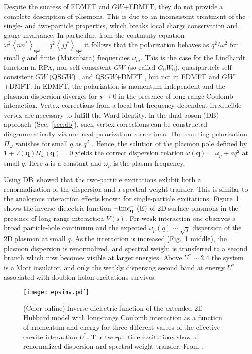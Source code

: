 \documentclass[rmp,aps,reprint,amsmath,amssymb,superscriptaddress,showpacs,nofootinbib]{revtex4-1}
\newcommand{\qv}{\ensuremath{\mathbf{q}}}
\newcommand{\vc}[1]{\ensuremath{\mathbf{#1}}}
\newcommand{\av}[1]{\ensuremath{\left\langle #1 \right\rangle}}
\begin{document}
Despite the success of EDMFT and $GW$+EDMFT, they do not provide a complete description of plasmons. This is due to an inconsistent treatment of the single- and two-particle properties, which breaks local charge conservation and gauge invariance. In particular, from the continuity equation $\omega^2 \av{nn^{*}}_{{\qv\omega}}=q^2 \av{jj^{*}}_{{\qv\omega}}$ it follows that the polarization behaves as $q^{2}/\omega^{2}$ for small $q$ and finite (Matsubara) frequencies $\omega_{m}$. This is the case for the Lindhardt function in RPA, non-self-consistent $GW$ (so-called $G_{0}W_{0}$), quasiparticle self-consistent $GW$ (QS$GW$) \cite{Faleev2004}, and  QS$GW$+DMFT \cite{jmt_sces14}, but not in  EDMFT and $GW$+DMFT. In EDMFT, the polarization is momentum independent and the plasmon dispersion diverges for $q\to 0$ in the presence of long-range Coulomb interaction. Vertex corrections from a local but frequency-dependent irreducible vertex are necessary to fulfill the Ward identity. In the dual boson (DB) approach~(Sec.~\ref{sec:db}), such vertex corrections  can be  constructed diagrammatically via nonlocal polarization corrections. The resulting polarization $\Pi_{\omega}$ vanishes for small $q$  as $q^2$ \cite{Rubtsov12,Hafermann2014,Stepanov2016}. Hence, the solution of the plasmon pole defined by $1+V(\qv)\Pi_{\omega}(\qv)=0$ yields the correct  dispersion relation $\omega(\qv) = \omega_p + a q ^2$ at small $q$. Here $a$ is a constant and $\omega_p$ is the plasma frequency.

Using DB,  showed that the two-particle excitations exhibit both a renormalization of the dispersion and a spectral weight transfer. This is similar to the analogous interaction effects known for single-particle excitations. Figure~\ref{fig:2dplasmons} shows the inverse dielectric function $-\rm{Im}\epsilon_{\vc{q}}^{-1}(E)$ of 2D surface plasmons in the presence of long-range interaction $V(q)$. For weak interaction one observes a broad particle-hole continuum and the expected $\omega_{p}(q) \sim \sqrt{q}$ dispersion of the 2D plasmon  at small $q$.  As the interaction is increased (Fig.~\ref{fig:2dplasmons} middle), the plasmon dispersion is renormalized, and spectral weight is transferred to a  second branch which now becomes visible at larger energies. Above $U^{*}\sim 2.4$ the system is a Mott insulator, and only the weakly dispersing second band at energy $U^{*}$ associated with doublon-holon excitations survives.

\begin{figure}[bt]
\begin{center}
  \texttt{[image: epsinv.pdf]} 
\end{center}
    \caption{(Color online) Inverse dielectric function of the extended 2D Hubbard model with long-range Coulomb interaction as a function of momentum and energy for three different values of the effective on-site interaction $U^{*}$. The two-particle excitations show a renormalized dispersion and spectral weight transfer. From~.}
  \label{fig:2dplasmons}
\end{figure}
\end{document}
